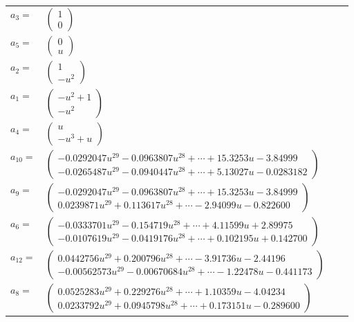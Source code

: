 \documentclass[1p]{elsarticle_modified}
\theoremstyle{definition}
\begin{document}
\begin{tabular}{m{7pt} m{180pt} m{7pt} m{180pt} }
\flushright $a_{3}=$&$\begin{pmatrix}1\\0\end{pmatrix}$ \\
\flushright $a_{5}=$&$\begin{pmatrix}0\\u\end{pmatrix}$ \\
\flushright $a_{2}=$&$\begin{pmatrix}1\\- u^2\end{pmatrix}$ \\
\flushright $a_{1}=$&$\begin{pmatrix}- u^2+1\\- u^2\end{pmatrix}$ \\
\flushright $a_{4}=$&$\begin{pmatrix}u\\- u^3+u\end{pmatrix}$ \\
\flushright $a_{10}=$&$\begin{pmatrix}-0.0292047 u^{29}-0.0963807 u^{28}+\cdots+15.3253 u-3.84999\\-0.0265487 u^{29}-0.0940447 u^{28}+\cdots+5.13027 u-0.0283182\end{pmatrix}$ \\
\flushright $a_{9}=$&$\begin{pmatrix}-0.0292047 u^{29}-0.0963807 u^{28}+\cdots+15.3253 u-3.84999\\0.0239871 u^{29}+0.113617 u^{28}+\cdots-2.94099 u-0.822600\end{pmatrix}$ \\
\flushright $a_{6}=$&$\begin{pmatrix}-0.0333701 u^{29}-0.154719 u^{28}+\cdots+4.11599 u+2.89975\\-0.0107619 u^{29}-0.0419176 u^{28}+\cdots+0.102195 u+0.142700\end{pmatrix}$ \\
\flushright $a_{12}=$&$\begin{pmatrix}0.0442756 u^{29}+0.200796 u^{28}+\cdots-3.91736 u-2.44196\\-0.00562573 u^{29}-0.00670684 u^{28}+\cdots-1.22478 u-0.441173\end{pmatrix}$ \\
\flushright $a_{8}=$&$\begin{pmatrix}0.0525283 u^{29}+0.229276 u^{28}+\cdots+1.10359 u-4.04234\\0.0233792 u^{29}+0.0945798 u^{28}+\cdots+0.173151 u-0.289600\end{pmatrix}$ \\

\end{tabular}
\end{document}
